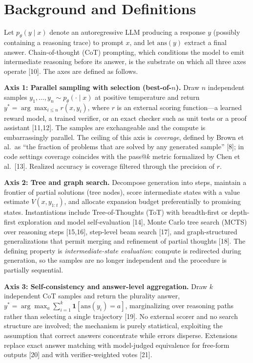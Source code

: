 \documentclass[10pt]{article}
\begin{document}
\section{Background and Definitions}
\label{sec:background}

Let $p_\theta(y \mid x)$ denote an autoregressive LLM producing a response $y$ (possibly containing a reasoning trace) to prompt $x$, and let $\mathrm{ans}(y)$ extract a final answer. Chain-of-thought (CoT) prompting, which conditions the model to emit intermediate reasoning before its answer, is the substrate on which all three axes operate [10]. The axes are defined as follows.

\textbf{Axis 1: Parallel sampling with selection (best-of-$n$).} Draw $n$ independent samples $y_1,\dots,y_n \sim p_\theta(\cdot \mid x)$ at positive temperature and return $y^\ast = \arg\max_{i \le n} r(x, y_i)$, where $r$ is an external scoring function---a learned reward model, a trained verifier, or an exact checker such as unit tests or a proof assistant [11,12]. The samples are exchangeable and the compute is embarrassingly parallel. The ceiling of this axis is \emph{coverage}, defined by Brown et al.\ as ``the fraction of problems that are solved by any generated sample'' [8]; in code settings coverage coincides with the pass@$k$ metric formalized by Chen et al.\ [13]. Realized accuracy is coverage filtered through the precision of $r$.

\textbf{Axis 2: Tree and graph search.} Decompose generation into steps, maintain a frontier of partial solutions (tree nodes), score intermediate states with a value estimate $V(x, y_{1:t})$, and allocate expansion budget preferentially to promising states. Instantiations include Tree-of-Thoughts (ToT) with breadth-first or depth-first exploration and model self-evaluation [14], Monte Carlo tree search (MCTS) over reasoning steps [15,16], step-level beam search [17], and graph-structured generalizations that permit merging and refinement of partial thoughts [18]. The defining property is \emph{intermediate-state evaluation}: compute is redirected during generation, so the samples are no longer independent and the procedure is partially sequential.

\textbf{Axis 3: Self-consistency and answer-level aggregation.} Draw $k$ independent CoT samples and return the plurality answer, $y^\ast = \arg\max_a \sum_{i=1}^{k} \mathbf{1}[\mathrm{ans}(y_i) = a]$, marginalizing over reasoning paths rather than selecting a single trajectory [19]. No external scorer and no search structure are involved; the mechanism is purely statistical, exploiting the assumption that correct answers concentrate while errors disperse. Extensions replace exact answer matching with model-judged equivalence for free-form outputs [20] and with verifier-weighted votes [21].
\end{document}
